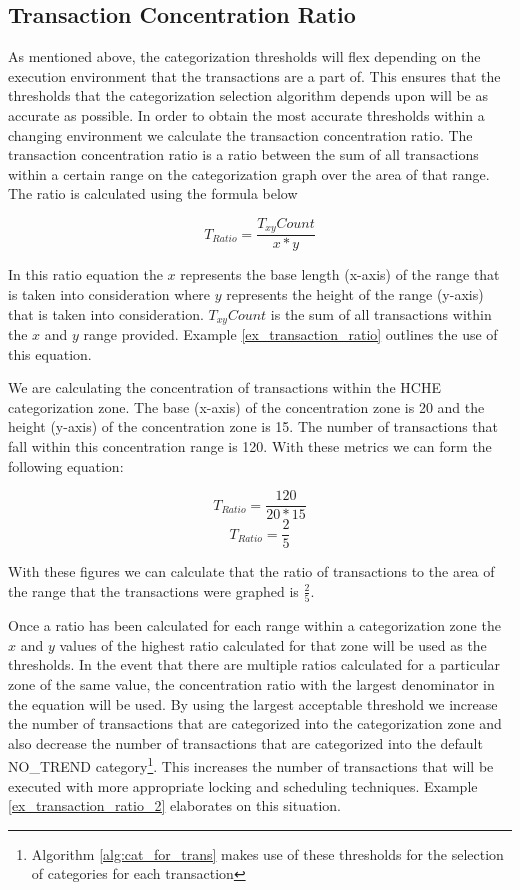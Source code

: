\subsection{Transaction Concentration Ratio}
\label{pbs:TCR}

As mentioned above, the categorization thresholds will flex depending on the execution environment that the transactions are a part of. This ensures that the thresholds that the categorization selection algorithm depends upon will be as accurate as possible. In order to obtain the most accurate thresholds within a changing environment we calculate the transaction concentration ratio. The transaction concentration ratio is a ratio between the sum of all transactions within a certain range on the categorization graph over the area of that range. The ratio is calculated using the formula below

\[\textrm{$T_{Ratio}$} =\frac{\textrm{$T_{xy}{Count}$}}{x * y}\]

In this ratio equation the $x$ represents the base length (x-axis) of the range that is taken into consideration where $y$ represents the height of the range (y-axis) that is taken into consideration. $T_{xy}{Count}$ is the sum of all transactions within the $x$ and $y$ range provided. Example \ref{ex_transaction_ratio} outlines the use of this equation.

 \begin{example}
 \label{ex_transaction_ratio}
  We are calculating the concentration of transactions within the HCHE categorization zone. The base (x-axis) of the concentration zone is 20 and the height (y-axis) of the concentration zone is 15. The number of transactions that fall within this concentration range is 120. With these metrics we can form the following equation:
  
  \[\textrm{$T_{Ratio}$} =\frac{\textrm{120}}{20 * 15}\]
  \[\textrm{$T_{Ratio}$} =\frac{\textrm{2}}{5}\]
  
  With these figures we can calculate that the ratio of transactions to the area of the range that the transactions were graphed is \( \frac{2}{5} \).
  
 \end{example}
 
Once a ratio has been calculated for each range within a categorization zone the $x$ and $y$ values of the highest ratio calculated for that zone will be used as the thresholds. In the event that there are multiple ratios calculated for a particular zone of the same value, the concentration ratio with the largest denominator in the equation will be used. By using the largest acceptable threshold we increase the number of transactions that are categorized into the categorization zone and also decrease the number of transactions that are categorized into the default NO\_TREND category\footnote{Algorithm \ref{alg:cat_for_trans} makes use of these thresholds for the selection of categories for each transaction}. This increases the number of transactions that will be executed with more appropriate locking and scheduling techniques. Example \ref{ex_transaction_ratio_2} elaborates on this situation.

